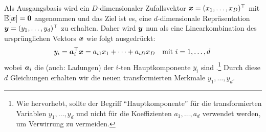 Als Ausgangsbasis wird ein $D$-dimensionaler Zufallsvektor $\bm{x} = (x_1, \ldots,
		x_D)^\top$ mit $\operatorname{\mathbb{E}}[\bm{x}] = \bm{0}$ angenommen und das Ziel ist es, eine $d$-dimensionale
Repräsentation $\bm{y} = (y_1,\ldots,y_d)^\top$ zu erhalten. Daher wird $\bm{y}$
nun als eine Linearkombination des ursprünglichen Vektors $\bm{x}$ wie folgt ausgedrückt:
\begin{equation}
	y_i = \bm{a}_i^\top \bm{x} = a_{i1} x_1 + \cdots + a_{iD} x_D
	\quad \text{mit } i = 1,\ldots,d \,
\end{equation}
wobei $\bm{a}_i$ die  (auch: Ladungen) der $i$-ten Hauptkomponente $y_i$ sind \parencite[vgl.][2]{Jolliffe.2002}.\footnote{Wie \textcite[6]{Jolliffe.2002} hervorhebt, sollte der
	Begriff \enquote{Hauptkomponente} für die transformierten Variablen $y_1, \ldots, y_d$ und nicht
	für die Koeffizienten $a_1, \ldots, a_d$ verwendet werden, um Verwirrung zu vermeiden.} Durch diese
$d$ Gleichungen erhalten wir die neuen transformierten Merkmale $y_1, \ldots, y_d$.

